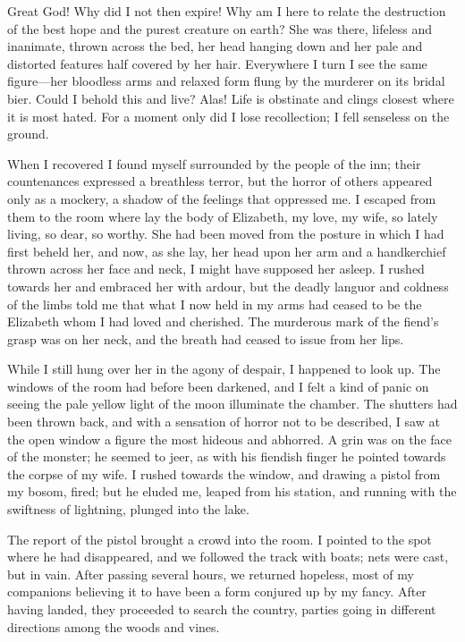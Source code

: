 \documentclass[12pt,openright]{book}
\begin{document}
Great God! Why did I not then expire! Why am I here to relate the destruction of the best hope and the purest creature on earth? She was there, lifeless and inanimate, thrown across the bed, her head hanging down and her pale and distorted features half covered by her hair. Everywhere I turn I see the same figure—her bloodless arms and relaxed form flung by the murderer on its bridal bier. Could I behold this and live? Alas! Life is obstinate and clings closest where it is most hated. For a moment only did I lose recollection; I fell senseless on the ground.

When I recovered I found myself surrounded by the people of the inn; their countenances expressed a breathless terror, but the horror of others appeared only as a mockery, a shadow of the feelings that oppressed me. I escaped from them to the room where lay the body of Elizabeth, my love, my wife, so lately living, so dear, so worthy. She had been moved from the posture in which I had first beheld her, and now, as she lay, her head upon her arm and a handkerchief thrown across her face and neck, I might have supposed her asleep. I rushed towards her and embraced her with ardour, but the deadly languor and coldness of the limbs told me that what I now held in my arms had ceased to be the Elizabeth whom I had loved and cherished. The murderous mark of the fiend’s grasp was on her neck, and the breath had ceased to issue from her lips.

While I still hung over her in the agony of despair, I happened to look up. The windows of the room had before been darkened, and I felt a kind of panic on seeing the pale yellow light of the moon illuminate the chamber. The shutters had been thrown back, and with a sensation of horror not to be described, I saw at the open window a figure the most hideous and abhorred. A grin was on the face of the monster; he seemed to jeer, as with his fiendish finger he pointed towards the corpse of my wife. I rushed towards the window, and drawing a pistol from my bosom, fired; but he eluded me, leaped from his station, and running with the swiftness of lightning, plunged into the lake.

The report of the pistol brought a crowd into the room. I pointed to the spot where he had disappeared, and we followed the track with boats; nets were cast, but in vain. After passing several hours, we returned hopeless, most of my companions believing it to have been a form conjured up by my fancy. After having landed, they proceeded to search the country, parties going in different directions among the woods and vines.
\end{document}
